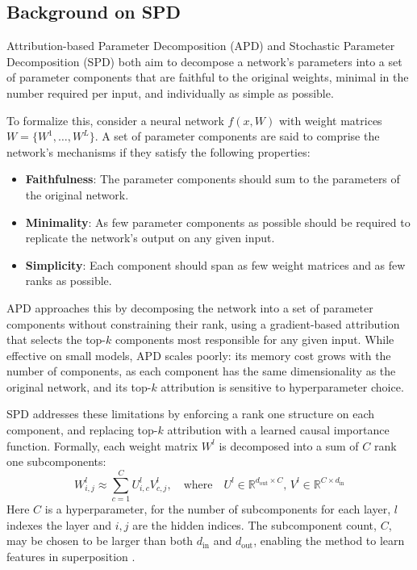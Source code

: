 \documentclass{article}
\begin{document}
\subsection{Background on SPD}
\label{sec:spd_background}
Attribution-based Parameter Decomposition (APD) \autocite{AttributionBasedParameterDecomposition}
and Stochastic Parameter Decomposition (SPD) \autocite{stochasticparameterdecomposition} both aim to decompose
a network's parameters into a set of parameter components that are faithful
to the original weights, minimal in the number required per input,
and individually as simple as possible.

To formalize this, consider a neural network $f(x, W)$ with weight matrices $W = \{W^{1}, \dots, W^L\}$.
A set of parameter components are said to comprise the network's mechanisms if they satisfy the following properties:
\renewcommand\labelitemi{\tiny$\bullet$}
\begin{itemize}
    \setlength\itemsep{0em}
    \item \textbf{Faithfulness}: The parameter components should sum to the 
          parameters of the original network.
    \item \textbf{Minimality}: As few parameter components as possible should 
          be required to replicate the network's output on any given input.
    \item \textbf{Simplicity}: Each component should span as few weight 
          matrices and as few ranks as possible.
\end{itemize}

APD \autocite{AttributionBasedParameterDecomposition} approaches this by decomposing
the network into a set of parameter components without constraining
their rank, using a gradient-based attribution that selects the top-$k$ components most
responsible for any given input. While effective on small models,
APD scales poorly: its memory cost grows with the number of components,
as each component has the same dimensionality as the original network,
and its top-$k$ attribution is sensitive to hyperparameter choice.

SPD \autocite{stochasticparameterdecomposition} addresses these limitations by enforcing a rank one structure on each component, and replacing top-$k$ attribution with a learned causal importance function. Formally, each weight matrix $W^l$ is decomposed into a sum of $C$ rank one subcomponents:
\begin{equation}
W^{l}_{i,j} \approx \sum_{c=1}^{C} U^{l}_{i,c} V^{l}_{c,j}, 
\quad \text{where} \quad U^l \in \mathbb{R}^{d_{\text{out}} \times C}, \, V^l \in \mathbb{R}^{C \times d_{\text{in}}}
\end{equation}
Here $C$ is a hyperparameter, for the number of subcomponents for each layer, $l$ indexes the layer and $i,j$ are the hidden indices.
The subcomponent count, $C$, may be chosen to be larger than both $d_{\text{in}}$ and $d_{\text{out}}$, enabling the method to learn features in superposition \autocite{stochasticparameterdecomposition}.
\end{document}
